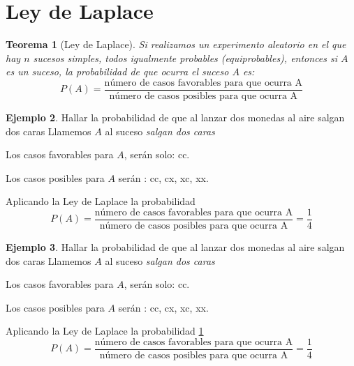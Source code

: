 \documentclass[]{book}
\theoremstyle{plain}
\newtheorem{theorem}{Teorema}[section]
\theoremstyle{definition}
\newtheorem{example}[theorem]{Ejemplo}
\theoremstyle{definition} %
\begin{document}
\section{Ley de Laplace}

\begin{theorem}[Ley de Laplace]\label{th_laplace}
  Si realizamos un experimento aleatorio en el que hay $n$ sucesos 
  simples, todos igualmente probables (equiprobables), 
  entonces si $A$ es un suceso, 
  la probabilidad de que ocurra el suceso $A$ es:
  \begin{equation}\label{equ_array}
    P(A) = \frac{\text{número de casos favorables para que ocurra A}}{\text{número de casos posibles para que ocurra A}}
  \end{equation}
\end{theorem}

\begin{example}
  Hallar la probabilidad de que al lanzar dos monedas al aire salgan dos caras
  Llamemos $A$ al suceso \emph{salgan dos caras}
  
  Los casos favorables para $A$, serán solo: cc.

  Los casos posibles para $A$ serán : cc, cx, xc, xx.
  
  Aplicando la Ley de Laplace la probabilidad
  \[     P(A) = \frac{\text{número de casos favorables para que ocurra A}}{\text{número de casos posibles para que ocurra A}} = \frac{1}{4}\]
\end{example}


\begin{example}
  Hallar la probabilidad de que al lanzar dos monedas al aire salgan dos caras
  Llamemos $A$ al suceso \emph{salgan dos caras}
  
  Los casos favorables para $A$, serán solo: cc.

  Los casos posibles para $A$ serán : cc, cx, xc, xx.
  
  Aplicando la Ley de Laplace la probabilidad \ref{th_laplace}
  \[     P(A) = \frac{\text{número de casos favorables para que ocurra A}}{\text{número de casos posibles para que ocurra A}} = \frac{1}{4}\]
\end{example}
\end{document}
